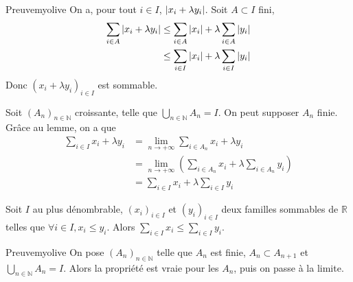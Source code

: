     \begin{demo}{Preuve}{myolive}
        On a, pour tout $i \in I$, $\left\lvert x_i + \lambda y_i\right\rvert$. Soit $A \subset I$ fini, 
        \begin{align*}
            \sum_{i \in A} \left\lvert x_i + \lambda y_i\right\rvert 
            &\leq \sum_{i \in A} \left\lvert x_i\right\rvert + \lambda \sum_{i \in A} \left\lvert y_i\right\rvert \\
            &\leq \sum_{i \in I} \left\lvert x_i\right\rvert + \lambda \sum_{i \in I} \left\lvert y_i\right\rvert 
        \end{align*}
        Donc $(x_i + \lambda y_i)_{i \in I}$ est sommable.

        Soit $(A_n)_{n \in \mathbb{N}}$ croissante, telle que $\bigcup_{n \in \mathbb{N}} A_n = I$. On peut supposer $A_n$ finie. Grâce au lemme, on a que 
        \begin{align*}
            \sum_{i \in I} x_i + \lambda y_i 
            &= \lim_{n \to +\infty} \sum_{i \in A_n} x_i + \lambda y_i \\ 
            &= \lim_{n \to +\infty} \left(\sum_{i \in A_n} x_i + \lambda \sum_{i \in A_n} y_i\right) \\
            &= \sum_{i \in I} x_i + \lambda \sum_{i \in I} y_i
        \end{align*}
    \end{demo}

    \begin{prop}{}{}
        Soit $I$ au plus dénombrable, $(x_i)_{i \in I}$ et $(y_i)_{i \in I}$ deux familles sommables de $\mathbb{R}$ telles que $\forall i \in I, x_i \leq y_i$. 
        Alors $\sum_{i \in I} x_i \leq \sum_{i \in I} y_i$.
    \end{prop}

    \begin{demo}{Preuve}{myolive}
        On pose $(A_n)_{n \in \mathbb{N}}$ telle que $A_n$ est finie, $A_n \subset A_{n+1}$ et $\bigcup_{n \in \mathbb{N}} A_n = I$. Alors la propriété est vraie pour les $A_n$, puis on passe à la limite.
    \end{demo}

